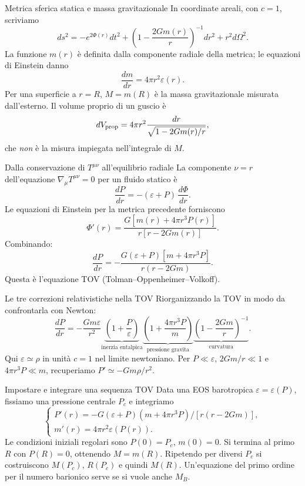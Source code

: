 \begin{frame}[t]{Metrica sferica statica e massa gravitazionale}
\small
In coordinate areali, con $c=1$, scriviamo
\[
ds^2=-e^{2\Phi(r)}dt^2+
\left(1-\frac{2Gm(r)}r\right)^{-1}dr^2+r^2d\Omega^2.
\]
La funzione $m(r)$ è definita dalla componente radiale della metrica; le equazioni di Einstein danno
\[
\frac{dm}{dr}=4\pi r^2\varepsilon(r).
\]
Per una superficie a $r=R$, $M=m(R)$ è la massa gravitazionale misurata dall'esterno. Il volume proprio di un guscio è
\[
dV_{\rm prop}=4\pi r^2\frac{dr}{\sqrt{1-2Gm(r)/r}},
\]
che \emph{non} è la misura impiegata nell'integrale di $M$.
\end{frame}

\begin{frame}[t]{Dalla conservazione di $T^{\mu\nu}$ all'equilibrio radiale}
\small
La componente $\nu=r$ dell'equazione $\nabla_\mu T^{\mu\nu}=0$ per un fluido statico è
\[
\frac{dP}{dr}=-(\varepsilon+P)\,\frac{d\Phi}{dr}.
\]
Le equazioni di Einstein per la metrica precedente forniscono
\[
\Phi'(r)=\frac{G[m(r)+4\pi r^3P(r)]}{r[r-2Gm(r)]}.
\]
Combinando:
\[
\frac{dP}{dr}=-\frac{G(\varepsilon+P)[m+4\pi r^3P]}{r(r-2Gm)}.
\]
Questa è l'equazione TOV (Tolman--Oppenheimer--Volkoff).
\end{frame}

\begin{frame}[t]{Le tre correzioni relativistiche nella TOV}
\small
Riorganizzando la TOV in modo da confrontarla con Newton:
\[
\frac{dP}{dr}=-\frac{Gm\varepsilon}{r^2}
\underbrace{\left(1+\frac{P}{\varepsilon}\right)}_{\text{inerzia entalpica}}
\underbrace{\left(1+\frac{4\pi r^3P}{m}\right)}_{\text{pressione gravita}}
\underbrace{\left(1-\frac{2Gm}{r}\right)^{-1}}_{\text{curvatura}}.
\]
Qui $\varepsilon\simeq\rho$ in unità $c=1$ nel limite newtoniano.
\medskip
Per $P\ll\varepsilon$, $2Gm/r\ll1$ e $4\pi r^3P\ll m$, recuperiamo
$P'\simeq-Gm\rho/r^2$.
\end{frame}

\begin{frame}[t]{Impostare e integrare una sequenza TOV}
\small
Data una EOS barotropica $\varepsilon=\varepsilon(P)$, fissiamo una pressione centrale $P_c$ e integriamo
\[
\begin{cases}
P'(r)=-G(\varepsilon+P)(m+4\pi r^3P)/[r(r-2Gm)],\\[2pt]
m'(r)=4\pi r^2\varepsilon(P(r)).
\end{cases}
\]
Le condizioni iniziali regolari sono $P(0)=P_c$, $m(0)=0$. Si termina al primo $R$ con $P(R)=0$, ottenendo $M=m(R)$.
\medskip
Ripetendo per diversi $P_c$ si costruiscono $M(P_c)$, $R(P_c)$ e quindi $M(R)$. Un'equazione del primo ordine per il numero barionico serve se si vuole anche $M_B$.
\end{frame}

